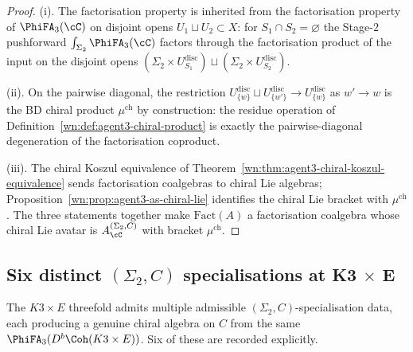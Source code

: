 \begin{proof}
(i). The factorisation property is inherited from the factorisation property of $\PhiFA_3(\cC)$ on disjoint opens $U_1\sqcup U_2\subset X$: for $S_1\cap S_2=\varnothing$ the Stage-$2$ pushforward $\int_{\Sigma_2}\PhiFA_3(\cC)$ factors through the factorisation product of the input on the disjoint opens $(\Sigma_2\times U_{S_1}^{\mathrm{disc}})\sqcup(\Sigma_2\times U_{S_2}^{\mathrm{disc}})$.

(ii). On the pairwise diagonal, the restriction $U^{\mathrm{disc}}_{\{w\}}\sqcup U^{\mathrm{disc}}_{\{w'\}}\to U^{\mathrm{disc}}_{\{w\}}$ as $w'\to w$ is the BD chiral product $\mu^{\mathrm{ch}}$ by construction: the residue operation of Definition~\ref{wn:def:agent3-chiral-product} is exactly the pairwise-diagonal degeneration of the factorisation coproduct.

(iii). The chiral Koszul equivalence of Theorem~\ref{wn:thm:agent3-chiral-koszul-equivalence} sends factorisation coalgebras to chiral Lie algebras; Proposition~\ref{wn:prop:agent3-as-chiral-lie} identifies the chiral Lie bracket with $\mu^{\mathrm{ch}}$. The three statements together make $\mathrm{Fact}(A)$ a factorisation coalgebra whose chiral Lie avatar is $A^{(\Sigma_2,C)}_\cC$ with bracket $\mu^{\mathrm{ch}}$.
\end{proof}

\subsection{Six distinct \texorpdfstring{$(\Sigma_2,C)$}{(Sigma-2, C)} specialisations at K3 \texorpdfstring{$\times$}{ x} E}
\label{wn:subsec:agent3-six-specialisations}

The $K3\times E$ threefold admits multiple admissible $(\Sigma_2,C)$-specialisation data, each producing a genuine chiral algebra on $C$ from the same $\PhiFA_3(D^b\Coh(K3\times E))$. Six of these are recorded explicitly.

